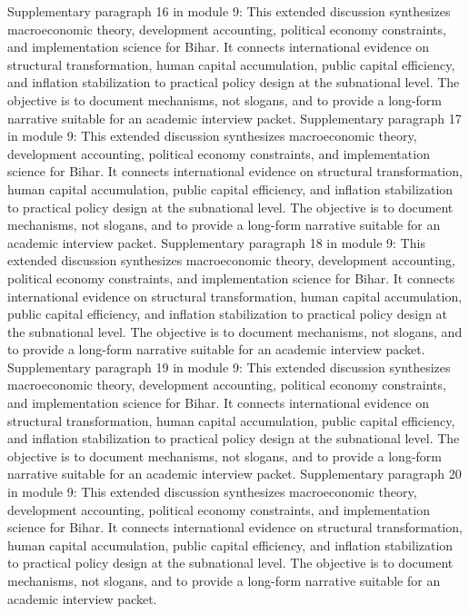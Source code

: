 \documentclass[preprint,12pt]{elsarticle}
\begin{document}
Supplementary paragraph 16 in module 9: This extended discussion synthesizes macroeconomic theory, development accounting, political economy constraints, and implementation science for Bihar. It connects international evidence on structural transformation, human capital accumulation, public capital efficiency, and inflation stabilization to practical policy design at the subnational level. The objective is to document mechanisms, not slogans, and to provide a long-form narrative suitable for an academic interview packet.
Supplementary paragraph 17 in module 9: This extended discussion synthesizes macroeconomic theory, development accounting, political economy constraints, and implementation science for Bihar. It connects international evidence on structural transformation, human capital accumulation, public capital efficiency, and inflation stabilization to practical policy design at the subnational level. The objective is to document mechanisms, not slogans, and to provide a long-form narrative suitable for an academic interview packet.
Supplementary paragraph 18 in module 9: This extended discussion synthesizes macroeconomic theory, development accounting, political economy constraints, and implementation science for Bihar. It connects international evidence on structural transformation, human capital accumulation, public capital efficiency, and inflation stabilization to practical policy design at the subnational level. The objective is to document mechanisms, not slogans, and to provide a long-form narrative suitable for an academic interview packet.
Supplementary paragraph 19 in module 9: This extended discussion synthesizes macroeconomic theory, development accounting, political economy constraints, and implementation science for Bihar. It connects international evidence on structural transformation, human capital accumulation, public capital efficiency, and inflation stabilization to practical policy design at the subnational level. The objective is to document mechanisms, not slogans, and to provide a long-form narrative suitable for an academic interview packet.
Supplementary paragraph 20 in module 9: This extended discussion synthesizes macroeconomic theory, development accounting, political economy constraints, and implementation science for Bihar. It connects international evidence on structural transformation, human capital accumulation, public capital efficiency, and inflation stabilization to practical policy design at the subnational level. The objective is to document mechanisms, not slogans, and to provide a long-form narrative suitable for an academic interview packet.
\end{document}
